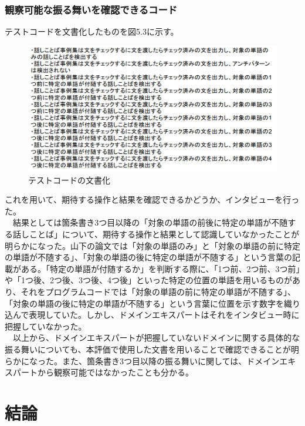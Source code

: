 \documentclass[12pt, a4paper]{jreport}
\begin{document}
\subsection{観察可能な振る舞いを確認できるコード}
テストコードを文書化したものを図5.3に示す。
\begin{figure}[H]
\centering
\includegraphics[width=1\linewidth]{image/hurumai.png}
\caption{テストコードの文書化}
\label{fig:enter-label}
\end{figure}
これを用いて、期待する操作と結果を確認できるかどうか、インタビューを行った。
\\　結果としては箇条書き3つ目以降の「対象の単語の前後に特定の単語が不随する話しことば」について、期待する操作と結果として認識していなかったことが明らかになった。山下の論文では「対象の単語のみ」と「対象の単語の前に特定の単語が不随する」、「対象の単語の後に特定の単語が不随する」という言葉の記載がある。「特定の単語が付随するか」を判断する際に、「1つ前、2つ前、3つ前」や「1つ後、2つ後、3つ後、4つ後」といった特定の位置の単語を用いるものがあり、それをプログラムコードでは「対象の単語の前に特定の単語が不随する」、「対象の単語の後に特定の単語が不随する」という言葉に位置を示す数字を織り込んで表現していた。しかし、ドメインエキスパートはそれをインタビュー時に把握していなかった。
\\　以上から、ドメインエキスパートが把握していないドメインに関する具体的な振る舞いについても、本評価で使用した文書を用いることで確認できることが明らかになった。また、箇条書き3つ目以降の振る舞いに関しては、ドメインエキスパートから観察可能ではなかったことも分かる。
\chapter{結論}
\end{document}

